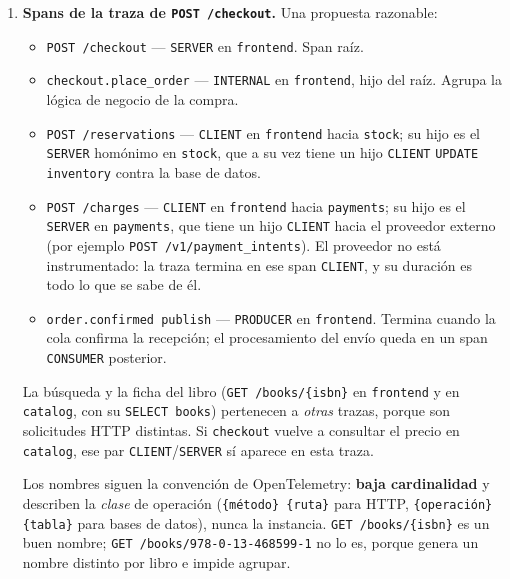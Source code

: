 \documentclass[variant=guia,cover=institutional,mode=screen]{ua-engineering-v6-article}
\begin{document}
\begin{uaanswer}
\begin{enumerate}
\item \textbf{Spans de la traza de \texttt{POST /checkout}.} Una propuesta razonable:
\begin{itemize}
\item \texttt{POST /checkout} --- \texttt{SERVER} en \texttt{frontend}. Span raíz.
\item \texttt{checkout.place\_order} --- \texttt{INTERNAL} en \texttt{frontend}, hijo del raíz. Agrupa la lógica de negocio de la compra.
\item \texttt{POST /reservations} --- \texttt{CLIENT} en \texttt{frontend} hacia \texttt{stock}; su hijo es el \texttt{SERVER} homónimo en \texttt{stock}, que a su vez tiene un hijo \texttt{CLIENT} \texttt{UPDATE inventory} contra la base de datos.
\item \texttt{POST /charges} --- \texttt{CLIENT} en \texttt{frontend} hacia \texttt{payments}; su hijo es el \texttt{SERVER} en \texttt{payments}, que tiene un hijo \texttt{CLIENT} hacia el proveedor externo (por ejemplo \texttt{POST /v1/payment\_intents}). El proveedor no está instrumentado: la traza termina en ese span \texttt{CLIENT}, y su duración es todo lo que se sabe de él.
\item \texttt{order.confirmed publish} --- \texttt{PRODUCER} en \texttt{frontend}. Termina cuando la cola confirma la recepción; el procesamiento del envío queda en un span \texttt{CONSUMER} posterior.
\end{itemize}
La búsqueda y la ficha del libro (\texttt{GET /books/\{isbn\}} en \texttt{frontend} y en \texttt{catalog}, con su \texttt{SELECT books}) pertenecen a \emph{otras} trazas, porque son solicitudes HTTP distintas. Si \texttt{checkout} vuelve a consultar el precio en \texttt{catalog}, ese par \texttt{CLIENT}/\texttt{SERVER} sí aparece en esta traza.

Los nombres siguen la convención de OpenTelemetry: \textbf{baja cardinalidad} y describen la \emph{clase} de operación (\texttt{\{método\} \{ruta\}} para HTTP, \texttt{\{operación\} \{tabla\}} para bases de datos), nunca la instancia. \texttt{GET /books/\{isbn\}} es un buen nombre; \texttt{GET /books/978-0-13-468599-1} no lo es, porque genera un nombre distinto por libro e impide agrupar.


\end{enumerate}
\end{uaanswer}
\end{document}
